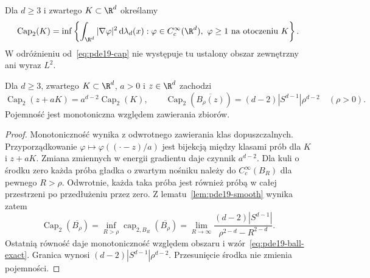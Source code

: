 \begin{definicja}
Dla $d\ge3$ i zwartego $K\subset\R^d$ określamy
\[
 \operatorname{Cap}_2(K)=\inf\left\{
 \int_{\R^d}|\nabla\varphi|^2\,\mathrm d\lambda_d(x):
 \varphi\in C_c^\infty(\R^d),\ \varphi\ge1
 \text{ na otoczeniu }K\right\}.
\]
W odróżnieniu od~\eqref{eq:pde19-cap} nie występuje tu
ustalony obszar zewnętrzny ani wyraz $L^2$.
\end{definicja}

\begin{stwierdzenie}
Dla $d\ge3$, zwartego $K\subset\R^d$, $a>0$ i
$z\in\R^d$ zachodzi
\[
 \operatorname{Cap}_2(z+aK)=a^{d-2}\operatorname{Cap}_2(K),
 \qquad
 \operatorname{Cap}_2(\overline{B_\rho(z)})
 =(d-2)|S^{d-1}|\rho^{d-2}\quad(\rho>0).
\]
Pojemność jest monotoniczna względem zawierania zbiorów.
\end{stwierdzenie}
\begin{proof}
Monotoniczność wynika z odwrotnego zawierania klas
dopuszczalnych. Przyporządkowanie
$\varphi\mapsto\varphi((\cdot-z)/a)$ jest bijekcją
między klasami prób dla $K$ i $z+aK$. Zmiana
zmiennych w energii gradientu daje czynnik $a^{d-2}$.
Dla kuli o środku zero każda próba gładka o zwartym
nośniku należy do $C_c^\infty(B_R)$ dla pewnego
$R>\rho$. Odwrotnie, każda taka próba jest również
próbą w całej przestrzeni po przedłużeniu przez zero.
Z lematu~\ref{lem:pde19-smooth} wynika zatem
\[
 \operatorname{Cap}_2(\overline{B_\rho})
 =\inf_{R>\rho}\operatorname{cap}_{2,B_R}(\overline{B_\rho})
 =\lim_{R\to\infty}
 \frac{(d-2)|S^{d-1}|}{\rho^{2-d}-R^{2-d}}.
\]
Ostatnią równość daje monotoniczność względem obszaru
i wzór~\eqref{eq:pde19-ball-exact}.
Granica wynosi $(d-2)|S^{d-1}|\rho^{d-2}$.
Przesunięcie środka nie zmienia pojemności.
\end{proof}



